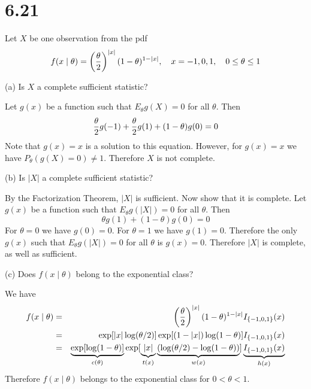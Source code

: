 \section*{6.21}
Let $X$ be one observation from the pdf
$$f(x\mid\theta)=\left({\theta\over2}\right)^{|x|}
(1-\theta)^{1-|x|},\quad x=-1,0,1,\quad 0\le\theta\le1$$

\bigskip
\noindent
(a) Is $X$ a complete sufficient statistic?

\bigskip
\noindent
Let $g(x)$ be a function such that $E_\theta g(X)=0$ for all $\theta$.
Then
$${\theta\over2}g(-1)+{\theta\over2}g(1)+(1-\theta)g(0)=0$$
Note that $g(x)=x$ is a solution to this equation.
However, for $g(x)=x$ we have $P_\theta(g(X)=0)\ne1$.
Therefore $X$ is not complete.

\bigskip
\noindent
(b) Is $|X|$ a complete sufficient statistic?

\bigskip
\noindent
By the Factorization Theorem, $|X|$ is sufficient.
Now show that it is complete.
Let $g(x)$ be a function such that $E_\theta g(|X|)=0$ for all
$\theta$.
Then
$$\theta g(1)+(1-\theta)g(0)=0$$
For $\theta=0$ we have $g(0)=0$.
For $\theta=1$ we have $g(1)=0$.
Therefore the only $g(x)$ such that
$E_\theta g(|X|)=0$ for all $\theta$ is $g(x)=0$.
Therefore $|X|$ is complete, as well as sufficient.

\bigskip
\noindent
(c) Does $f(x\mid\theta)$ belong to the exponential class?

\bigskip
\noindent
We have
\begin{eqnarray*}
f(x\mid\theta)
&=&
\left({\theta\over2}\right)^{|x|}(1-\theta)^{1-|x|}I_{\{-1,0,1\}}(x)\\
&=&
\exp[|x|\log(\theta/2)]\exp[(1-|x|)\log(1-\theta)]I_{\{-1,0,1\}}(x)\\
&=&
\underbrace{\exp[\log(1-\theta)]}_{c(\theta)}
\exp[
\underbrace{|x|}_{t(x)}
\underbrace{(\log(\theta/2)-\log(1-\theta))}_{w(x)}
]
\underbrace{I_{\{-1,0,1\}}(x)}_{h(x)}
\end{eqnarray*}
Therefore $f(x\mid\theta)$ belongs to the exponential class for
$0<\theta<1$.

